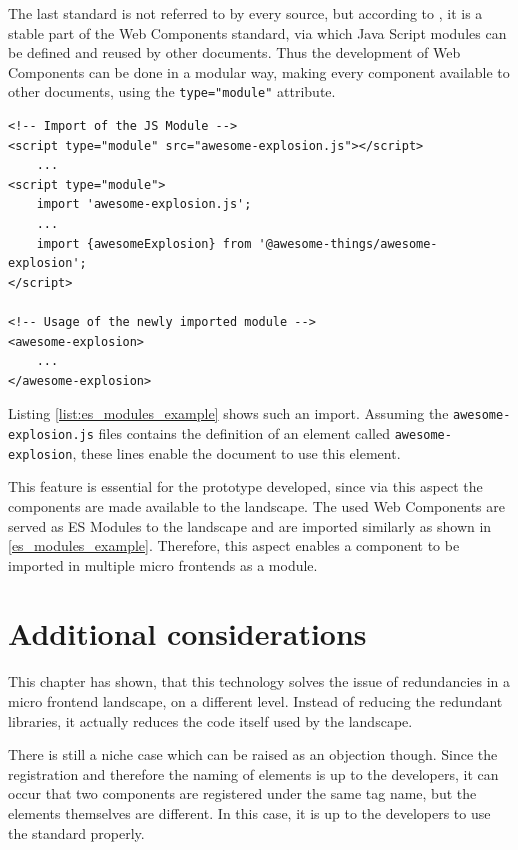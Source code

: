 The last standard is not referred to by every source, but according to \cite{wc_specifications}, it is a stable part of the Web Components standard, via which Java Script modules can be defined and reused by other documents.
Thus the development of Web Components can be done in a modular way, making every component available to other documents, using the \texttt{type="module"} attribute.

\begin{lstlisting}[language=HTML5, caption=Importing modular Java Script documents into another \cite{wc_specifications}, label=list:es_modules_example,  xleftmargin=.01\textwidth, xrightmargin=.01\textwidth]
<!-- Import of the JS Module -->
<script type="module" src="awesome-explosion.js"></script>
	...
<script type="module">
	import 'awesome-explosion.js';
	...
	import {awesomeExplosion} from '@awesome-things/awesome-explosion';
</script>

<!-- Usage of the newly imported module -->
<awesome-explosion>
	...
</awesome-explosion>
\end{lstlisting}

Listing \ref{list:es_modules_example} shows such an import. Assuming the \texttt{awesome-explosion.js} files contains the definition of an element called \texttt{awesome-explosion}, these lines enable the document to use this element.\cite{wc_specifications}

This feature is essential for the prototype developed, since via this aspect the components are made available to the landscape. The used Web Components are served as ES Modules to the landscape and are imported similarly as shown in \ref{es_modules_example}. Therefore, this aspect enables a component to be imported in multiple micro frontends as a module.

\section{Additional considerations}

This chapter has shown, that this technology solves the issue of redundancies in a micro frontend landscape, on a different level. Instead of reducing the redundant libraries, it actually reduces the code itself used by the landscape.

There is still a niche case which can be raised as an objection though. Since the registration and therefore the naming of elements is up to the developers, it can occur that two components are registered under the same tag name, but the elements themselves are different. In this case, it is up to the developers to use the standard properly.

